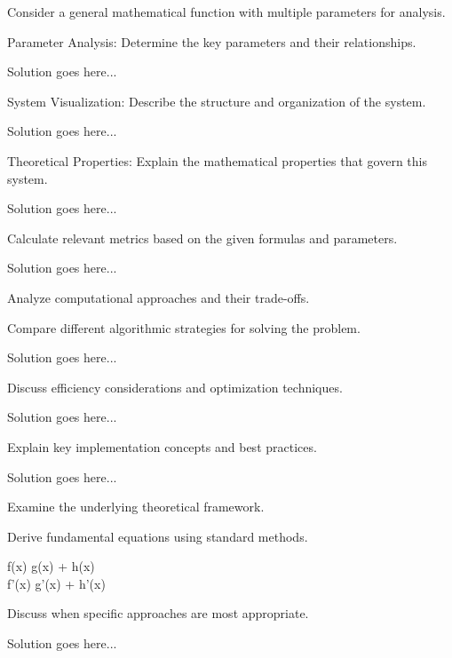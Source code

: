 \documentclass[partnumbering]{../homework}
\begin{document}


Consider a general mathematical function with multiple parameters for analysis.

\subproblem
Parameter Analysis: Determine the key parameters and their relationships.

Solution goes here...

\subproblem
System Visualization: Describe the structure and organization of the system.

Solution goes here...

\subproblem
Theoretical Properties: Explain the mathematical properties that govern this system.

Solution goes here...


\subproblem
Calculate relevant metrics based on the given formulas and parameters.

Solution goes here...


Analyze computational approaches and their trade-offs.

\subproblem
Compare different algorithmic strategies for solving the problem.

Solution goes here...

\subproblem
Discuss efficiency considerations and optimization techniques.

Solution goes here...


\subproblem
Explain key implementation concepts and best practices.

Solution goes here...


Examine the underlying theoretical framework.

\subproblem
Derive fundamental equations using standard methods.

\begin{hwmath}
f(x) \eq g(x) + h(x) \\
f'(x) \eq g'(x) + h'(x)
\end{hwmath}

\subproblem
Discuss when specific approaches are most appropriate.

Solution goes here...
\end{document}
